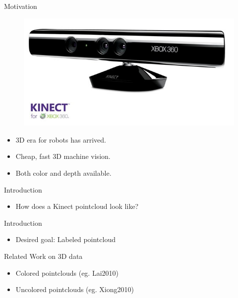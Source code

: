 \documentclass{beamer}
\begin{document}
\begin{frame}{Motivation}
	\begin{figure}[t!]
		\includegraphics[width=.5\linewidth]{kinect.jpg}
	\end{figure}

	\begin{itemize}
		\item 3D era for robots has arrived.
		\item Cheap, fast 3D machine vision.
		\item Both color and depth available.
	\end{itemize}

\end{frame}

\begin{frame}{Introduction}
	\begin{itemize}
		\item How does a Kinect pointcloud look like?

	\end{itemize}
\end{frame}

\begin{frame}{Introduction}
	\begin{itemize}
		\item Desired goal: Labeled pointcloud

	\end{itemize}
\end{frame}

\begin{frame}{Related Work on 3D data}

\begin{itemize}
\item Colored pointclouds (eg. Lai2010)
\item Uncolored pointclouds (eg. Xiong2010)
\end{itemize}
\end{frame}
\end{document}
